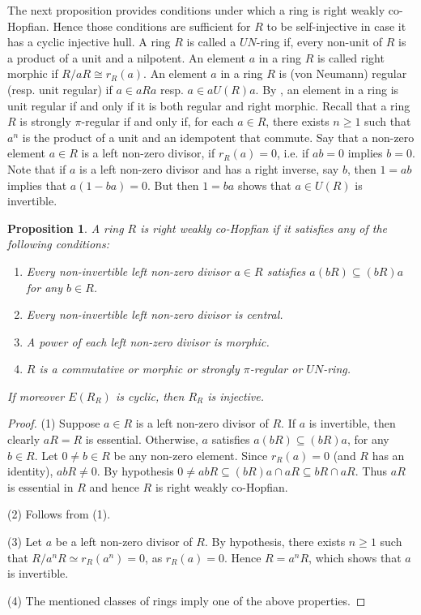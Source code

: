 \documentclass{amsart}
\theoremstyle{plain}
\newtheorem{proposition}[theorem]{Proposition}
\numberwithin{equation}{section}
\begin{document}
\medskip The next proposition provides conditions under
which a ring is right weakly co-Hopfian. Hence those conditions are sufficient for $R$ to be self-injective in case it has a cyclic injective hull. A ring $R$ is called a  {$U N$-ring} \cite{GC} if, every non-unit of $R$ is a product of a unit and a nilpotent. An element $a$ in a ring $R$ is called right  {morphic} \cite{NS} if $R/a R \cong r_{R} (a)$. An element $a$ in a ring $R$ is (von Neumann)  {regular} (resp.  {unit regular}) if $a \in a R a$ resp. $a \in a U (R) a$. By \cite[Example 4 and Proposition 5]{NS},
an element in a ring is unit regular if and only if it is both regular and right morphic. Recall that a ring $R$ is  {strongly $\pi $-regular} if and only if, for each $a \in R$, there exists $n \geq 1$ such that $a^{n}$ is the product of a unit and an idempotent that commute. Say that a non-zero element $a \in R$ is a left  {non-zero divisor}, if $r_{R} (a) =0$, i.e. if $a b =0$ implies $b =0$. Note that if $a$ is a left non-zero divisor and has a right inverse, say $b$, then $1 =a b$ implies that $a (1 -b a) =0$. But then $1 =b a$ shows that $a \in U (R)$ is invertible. 


\begin{proposition}
\label{E(R) cyclic implies Injective II} A ring
$R$ is right weakly co-Hopfian if it satisfies any of the following conditions: 


\begin{enumerate}
\item Every non-invertible left non-zero divisor $a \in R$ satisfies $a (b R) \subseteq (b R) a$ for any $b \in R$. 

\item Every non-invertible left non-zero divisor is central. 

\item A power of each left non-zero divisor is morphic. 

\item $R$ is a commutative or morphic or strongly $\pi $-regular or $U N$-ring. \end{enumerate}


If moreover $E (R_{R})$ is cyclic, then $R_{R}$ is injective. 
\end{proposition}


\begin{proof}
(1) Suppose $a \in R$ is a left non-zero divisor of $R$. If $a$ is invertible, then clearly $a R =R$ is essential. Otherwise, $a$ satisfies $a (b R) \subseteq (b R) a$, for any $b \in R$. Let $0 \neq b \in R$ be any non-zero element. Since $r_R(a) =0$ (and $R$ has an identity), $a b R \neq 0$. By hypothesis $0 \neq a b R \subseteq (b R) a \cap a R \subseteq b R \cap a R$. Thus $a R$ is essential in $R$ and hence $R$ is right weakly co-Hopfian. 

(2) Follows from (1). 

(3) Let $a$ be a left non-zero divisor of $R$. By hypothesis, there exists $n \geq 1$ such that $R/a^{n} R \simeq r_{R} (a^{n}) =0$, as $r_{R} (a) =0$. Hence $R =a^{n} R$, which shows that $a$ is invertible. 

(4) The mentioned classes of rings imply one of the above properties. 
\end{proof}
\end{document}
